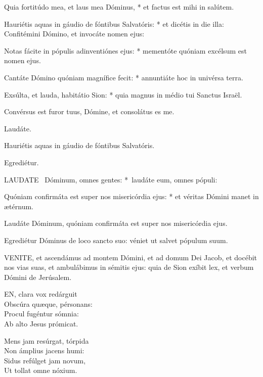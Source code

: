 Quia fortitúdo mea, et laus mea Dóminus, * et factus est mihi in salútem.

Hauriétis aquas in gáudio de fóntibus Salvatóris: * et dicétis in die illa: Confitémini Dómino, et invocáte nomen ejus:

Notas fácite in pópulis adinventiónes ejus: * mementóte quóniam excélsum est nomen ejus.

Cantáte Dómino quóniam magnífice fecit: * annuntiáte hoc in univérsa terra.

Exsúlta, et lauda, habitátio Sion: * quia magnus in médio tui Sanctus Israël.

 Convérsus est furor tuus, Dómine, et consolátus es me.

 Laudáte. \textdagger

  Hauriétis aquas in gáudio de fóntibus Salvatóris.

 Egrediétur.


\lettrine[lines=2]{L}{AUDATE} \textdagger\ Dóminum, omnes gentes: *\textdaggerdbl\ laudáte eum, omnes pópuli:

Quóniam confirmáta est super nos misericórdia ejus: * et véritas Dómini manet in ætérnum.

 Laudáte Dóminum, quóniam confirmáta est super nos misericórdia ejus.

  Egrediétur Dóminus de loco sancto suo: véniet ut salvet pópulum suum.



\lettrine[lines=2]{V}{ENITE}, et ascendámus ad montem Dómini, et ad domum Dei Jacob, et docébit nos vias suas, et ambulábimus in sémitis ejus: quia de Sion exíbit lex, et verbum Dómini de Jerúsalem.


\lettrine[lines=2]{E}{N}, clara vox redárguit\\
Obscúra quæque, pérsonans:\\
Procul fugéntur sómnia:\\
Ab alto Jesus prómicat.

Mens jam resúrgat, tórpida\\
Non ámplius jacens humi:\\
Sidus refúlget jam novum,\\
Ut tollat omne nóxium.

